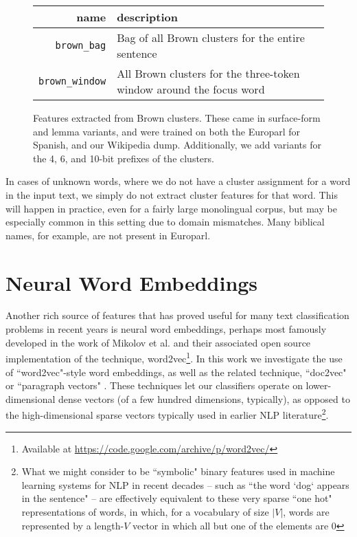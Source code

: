 \begin{figure*}
  \begin{centering}
  \begin{tabular}{|r|p{11cm}|}
    \hline
    name          & description  \\
    \hline
    \texttt{brown\_bag}    & Bag of all Brown clusters for the entire sentence \\
    \hline
    \texttt{brown\_window}  & All Brown clusters for the three-token window around the focus word \\
    \hline
  \end{tabular}
  \end{centering}
  \caption{Features extracted from Brown clusters. These came in surface-form
  and lemma variants, and were trained on both the Europarl for Spanish, and
  our Wikipedia dump. Additionally, we add variants for the 4, 6, and 10-bit
  prefixes of the clusters.}
  \label{fig:brownfeatures}
\end{figure*}

In cases of unknown words, where we do not have a cluster assignment for a word
in the input text, we simply do not extract cluster features for that word.
This will happen in practice, even for a fairly large monolingual corpus, but
may be especially common in this setting due to domain mismatches. Many
biblical names, for example, are not present in Europarl.

\section{Neural Word Embeddings}
Another rich source of features that has proved useful for many text
classification problems in recent years is neural word embeddings, perhaps most
famously developed in the work of Mikolov et al. \cite{mikolovword2vec} and
their associated open source implementation of the technique,
word2vec\footnote{Available at
\url{https://code.google.com/archive/p/word2vec/}}. In this work we investigate
the use of ``word2vec"-style word embeddings, as well as the related technique,
``doc2vec" or ``paragraph vectors"
\cite{dai-document-embedding-2015,quocle-distributed-representations-2014}.
These techniques let our classifiers operate on lower-dimensional dense vectors
(of a few hundred dimensions, typically), as opposed to the high-dimensional
sparse vectors typically used in earlier NLP literature\footnote{
What we might consider to be ``symbolic" binary features used in machine
learning systems for NLP in recent decades -- such as ``the word `dog` appears
in the sentence" -- are effectively equivalent to these very sparse ``one hot"
representations of words, in which, for a vocabulary of size $|V|$, words are
represented by a length-$V$ vector in which all but one of the elements are 0}.

